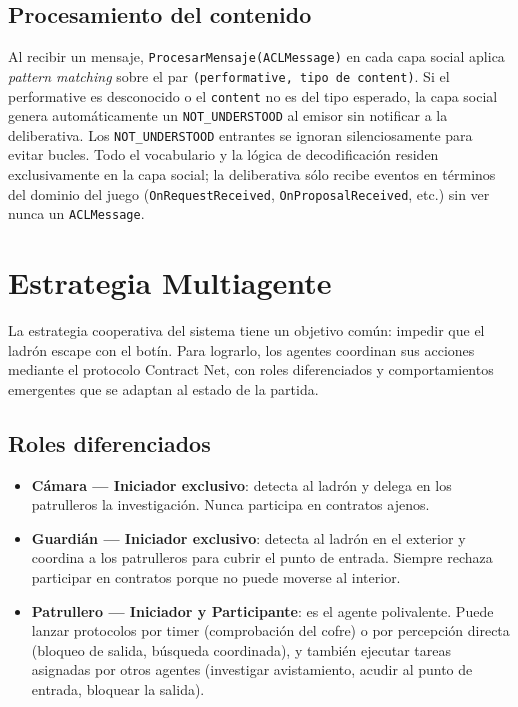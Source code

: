 \documentclass[a4paper,12pt]{article}
\begin{document}
\subsection*{Procesamiento del contenido}

Al recibir un mensaje, \texttt{ProcesarMensaje(ACLMessage)} en cada capa social aplica \textit{pattern matching} sobre el par \texttt{(performative, tipo de content)}. Si el performative es desconocido o el \texttt{content} no es del tipo esperado, la capa social genera automáticamente un \texttt{NOT\_UNDERSTOOD} al emisor sin notificar a la deliberativa. Los \texttt{NOT\_UNDERSTOOD} entrantes se ignoran silenciosamente para evitar bucles. Todo el vocabulario y la lógica de decodificación residen exclusivamente en la capa social; la deliberativa sólo recibe eventos en términos del dominio del juego (\texttt{OnRequestReceived}, \texttt{OnProposalReceived}, etc.) sin ver nunca un \texttt{ACLMessage}.


\section{Estrategia Multiagente}

La estrategia cooperativa del sistema tiene un objetivo común: impedir que el ladrón escape con el botín. Para lograrlo, los agentes coordinan sus acciones mediante el protocolo Contract Net, con roles diferenciados y comportamientos emergentes que se adaptan al estado de la partida.

\subsection*{Roles diferenciados}

\begin{itemize}
    \item \textbf{Cámara — Iniciador exclusivo}: detecta al ladrón y delega en los patrulleros la investigación. Nunca participa en contratos ajenos.
    \item \textbf{Guardián — Iniciador exclusivo}: detecta al ladrón en el exterior y coordina a los patrulleros para cubrir el punto de entrada. Siempre rechaza participar en contratos porque no puede moverse al interior.
    \item \textbf{Patrullero — Iniciador y Participante}: es el agente polivalente. Puede lanzar protocolos por timer (comprobación del cofre) o por percepción directa (bloqueo de salida, búsqueda coordinada), y también ejecutar tareas asignadas por otros agentes (investigar avistamiento, acudir al punto de entrada, bloquear la salida).
\end{itemize}
\end{document}
